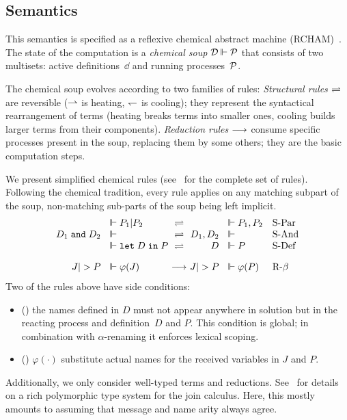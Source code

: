 \subsection{Semantics}


This semantics is specified as a reflexive chemical abstract machine
(RCHAM)~\cite{BeBo92}. The state of the computation
is a {\em chemical soup} $\dd \tth \pp$ that consists of two
multisets: active definitions~$\dd$ and running processes~${\cal P}$.

The chemical soup evolves according to two families of rules: {\em
  Structural rules} $\rightleftharpoons$ are reversible ($\rightharpoonup$ is heating,
$\leftharpoondown$ is cooling); they represent the syntactical rearrangement of
terms (heating breaks terms into smaller ones, cooling builds larger
terms from their components).  {\em Reduction rules} $\redsoupe$
consume specific processes present in the soup, replacing them by some
others; they are the basic computation steps.
%

We present simplified chemical rules
(see~\cite{FournetGonthier96,FGLMR96_Calculus_mobile_agent} for
the complete set of rules).
Following the chemical tradition, every rule applies on any matching
subpart of the soup, non-matching sub-parts of the soup being left
implicit.
$$
\let \N \name
\let \su \varphi
\begin{array}{rl@{~}c@{~}rl@{\quad}l}
  &\tth P_1 | P_2   &\redstruct&           &\tth P_1, P_2 &\mbox{S-Par}\\
D_1 \And D_2 &\tth             &\redstruct& D_ 1, D_2 &\tth   &\mbox{S-And}\\
             &\tth \Def D in P &\redstruct&         D  &\tth P
             &\mbox{S-Def} \\[1em]
      J |> P &\tth \su  (J)    &\redsoupe & J |> P    &\tth \su (P)
      &\mbox{R-$\beta$}
\end{array}
$$
Two of the rules above have side conditions:
\begin{itemize}
\item () 
the names defined in $D$ must not appear anywhere
in solution but in the reacting process and definition~$D$ and $P$.
This condition is global; in combination with $\alpha$-renaming it
enforces lexical scoping.

\item () $\varphi (\cdot)$ substitute actual names for
the received variables in $J$ and $P$.

\end{itemize}
Additionally, we only consider well-typed terms and reductions.
See~\cite{join-typing-97} for details on a rich polymorphic type system
for the join calculus. Here, this mostly amounts to assuming that
message and name arity always agree.



